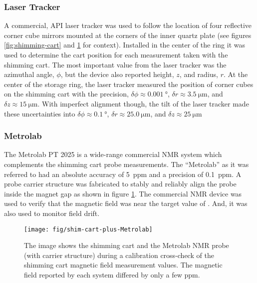 \subsubsection{Laser Tracker}
A commercial, API laser tracker was used to follow the location of four reflective corner cube mirrors mounted at the corners of the inner quartz plate (see figures \ref{fig:shimming-cart} and \ref{fig:shim-cart-plus-Metrolab} for context). Installed in the center of the ring it was used to determine the cart position for each measurement taken with the shimming cart.  The most important value from the laser tracker was the azimuthal angle, $\phi$, but the device also reported height, $z$, and radius, $r$.  At the center of the storage ring, the laser tracker measured the position of corner cubes on the shimming cart with the precision, $\delta\phi \approx \SI{0.001}{\degree}$, $\delta r \approx \SI{3.5}{\micro\meter}$, and $\delta z \approx \SI{15}{\micro\meter}$.  With imperfect alignment though, the tilt of the laser tracker made these uncertainties into $\delta\phi \approx \SI{0.1}{\degree}$, $\delta r \approx \SI{25.0}{\micro\meter}$, and $\delta z \approx \SI{25}{\micro\meter}$

\subsubsection{Metrolab}
The Metrolab PT 2025 is a wide-range commercial NMR system which complements the shimming cart probe measurements.  The ``Metrolab'' as it was referred to had an absolute accuracy of \SI{5}{ppm} and a precision of \SI{0.1}{ppm}.  A probe carrier structure was fabricated to stably and reliably align the probe inside the magnet gap as shown in figure \ref{fig:shim-cart-plus-Metrolab}.  The commercial NMR device was used to verify that the magnetic field was near the target value of \bmagic.  And, it was also used to monitor field drift.

\begin{figure}
\centering
\texttt{[image: fig/shim-cart-plus-Metrolab]}
\caption{
    The image shows the shimming cart and the Metrolab NMR probe (with carrier structure) during a calibration cross-check of the shimming cart magnetic field measurement values.  The magnetic field reported by each system differed by only a few ppm.
    \label{fig:shim-cart-plus-Metrolab}
}
\end{figure}

